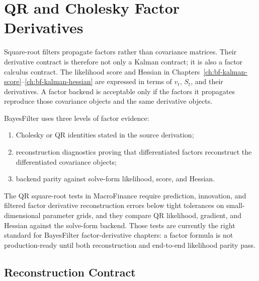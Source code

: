 \chapter{QR and Cholesky Factor Derivatives}
\label{ch:bf-factor-derivatives}

Square-root filters propagate factors rather than covariance matrices.  Their
derivative contract is therefore not only a Kalman contract; it is also a factor
calculus contract.  The likelihood score and Hessian in
Chapters~\ref{ch:bf-kalman-score}--\ref{ch:bf-kalman-hessian} are expressed in
terms of $v_t$, $S_t$, and their derivatives.  A factor backend is acceptable
only if the factors it propagates reproduce those covariance objects and the
same derivative objects.

BayesFilter uses three levels of factor evidence:
\begin{enumerate}[label=(\roman*)]
  \item Cholesky or QR identities stated in the source derivation;
  \item reconstruction diagnostics proving that differentiated factors
    reconstruct the differentiated covariance objects;
  \item backend parity against solve-form likelihood, score, and Hessian.
\end{enumerate}

The QR square-root tests in MacroFinance require prediction, innovation, and
filtered factor derivative reconstruction errors below tight tolerances on
small-dimensional parameter grids, and they compare QR likelihood, gradient,
and Hessian against the solve-form backend.  Those tests are currently the
right standard for BayesFilter factor-derivative chapters: a factor formula is
not production-ready until both reconstruction and end-to-end likelihood
parity pass.

\section{Reconstruction Contract}
\label{sec:bf-factor-reconstruction-contract}

